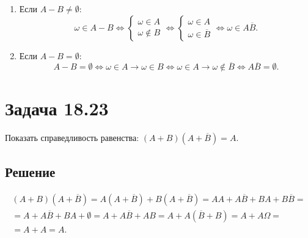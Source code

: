 \begin{enumerate}
    \item Если $A - B \neq \emptyset$:
    \begin{equation}
        \omega \in A - B
        \Leftrightarrow
        \left \{
        \begin{array}{l}
            \omega \in A \\
            \omega \notin B
        \end{array}
        \right .
        \Leftrightarrow
        \left \{
        \begin{array}{l}
            \omega \in A \\
            \omega \in \overline{B}
        \end{array}
        \right .
        \Leftrightarrow
        \omega \in A \overline{B} .
    \end{equation}

    \item Если $A - B = \emptyset$:
    \begin{equation}
        A - B = \emptyset
        \Leftrightarrow
        \omega \in A \rightarrow \omega \in B
        \Leftrightarrow
        \omega \in A \rightarrow \omega \notin \overline{B}
        \Leftrightarrow
        A \overline{B} = \emptyset .
    \end{equation}
\end{enumerate}


\section*{Задача 18.23}

Показать справедливость равенства: $\left ( A + B \right ) \left ( A + \overline{B} \right ) = A$.

\subsection*{Решение}

\begin{multline}
    \left ( A + B \right ) \left ( A + \overline{B} \right )
    = A \left ( A + \overline{B} \right ) + B \left ( A + \overline{B} \right )
    = A A + A \overline{B} + B A + B \overline{B} = \\
    = A + A \overline{B} + B A + \emptyset
    = A + A \overline{B} + A B
    = A + A \left ( \overline{B} + B \right )
    = A + A \Omega = \\
    = A + A
    = A
    .
\end{multline}

